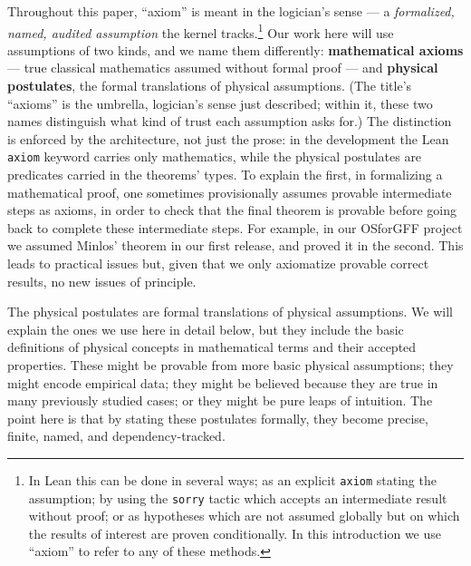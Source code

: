 \documentclass{article}
\theoremstyle{plain}
\theoremstyle{definition}
\numberwithin{equation}{section}
\newcommand{\code}[1]{\texttt{#1}}
\begin{document}
Throughout this paper, ``axiom'' is meant in the logician's sense --- a \emph{formalized, named, audited
assumption} the kernel tracks.\footnote{  In Lean this can be done in several ways; as an
explicit \code{axiom} stating the assumption; by using the \code{sorry} tactic which accepts an intermediate result
without proof; or as hypotheses which are not assumed globally but on which the results of interest are proven conditionally.
In this introduction we use ``axiom'' to refer to any of these methods.}
%
Our work here will use assumptions of two kinds, and we name them differently:
\textbf{mathematical axioms} --- true classical mathematics assumed without formal proof --- and
\textbf{physical postulates}, the formal translations of physical assumptions. (The title's
``axioms'' is the umbrella, logician's sense just described; within it, these two names
distinguish what kind of trust each assumption asks for.) The distinction is
enforced by the architecture, not just the prose: in the development the Lean \code{axiom}
keyword carries only mathematics, while the physical postulates are predicates carried in the
theorems' types.
To explain the first, in formalizing a mathematical proof, one sometimes provisionally assumes provable intermediate steps as axioms, in order
to check that the final theorem is provable before going back to complete these intermediate steps.  For example,
in our OSforGFF project \cite{douglas_formalization_2026} we assumed Minlos' theorem in our first release, and proved it in the second.
This leads to practical issues but, given that we only axiomatize provable correct results, no new issues of principle.

The physical postulates are formal translations of physical assumptions.   We will explain the ones we use here in detail below,
but they include the basic definitions of physical concepts in mathematical terms and their accepted properties.  These might
be provable from more basic physical assumptions; they might encode empirical data; they might be believed because they
are true in many previously studied cases; or they might be pure leaps of intuition.  The point here is that
by stating these postulates formally,
they become {precise, finite, named, and dependency-tracked}. 
\end{document}

